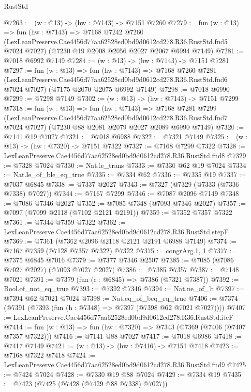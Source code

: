 \begin{lexlean}{RustStd}
\begin{coremodule}
@7263 := (w : @13) -> (hw : @7143) -> @7151 @7260
@7279 := fun (w : @13) =>
  fun (hw : @7143) =>
  @7168
    @7242
    @7260
    (LexLeanPreserve.Cae4456d77aa62528ed0bd9d0612cd278.R36.RustStd.fnd5 @7024 @7027)
    (@7230 @19 @2008 @2056 @2027 @2067 @6994 @7149)
@7281 := @7018 @6992 @7149
@7284 := (w : @13) -> (hw : @7143) -> @7151 @7281
@7297 := fun (w : @13) =>
  fun (hw : @7143) =>
  @7168
    @7260
    @7281
    (LexLeanPreserve.Cae4456d77aa62528ed0bd9d0612cd278.R36.RustStd.fnd6 @7024 @7027)
    (@7175 @2070 @2075 @6992 @7149)
@7298 := @7018 @6990
@7299 := @7298 @7149
@7302 := (w : @13) -> (hw : @7143) -> @7151 @7299
@7318 := fun (w : @13) =>
  fun (hw : @7143) =>
  @7168
    @7281
    @7299
    (LexLeanPreserve.Cae4456d77aa62528ed0bd9d0612cd278.R36.RustStd.fnd7 @7024 @7027)
    (@7230 @88 @2081 @2079 @2027 @2089 @6990 @7149)
@7320 := @7141 @19 @7027
@7321 := @7018 @6988
@7322 := @7321 @7149
@7325 := (w : @13) -> (hw : @7320) -> @7151 @7322
@7327 := @7168 @7299 @7322
@7328 := LexLeanPreserve.Cae4456d77aa62528ed0bd9d0612cd278.R36.RustStd.fnd8
@7329 := @7328 @7024
@7330 := Nat.le_trans
@7333 := @7330 @62 @19 @7024
@7334 := Nat.le_of_ble_eq_true
@7335 := @7334 @62
@7336 := @7335 @19
@7337 := @7037 @6845
@7338 := @7337 @2027
@7343 := @7327 (@7329 (@7333 (@7336 @7338) @7027))
@7344 := @7167 @7299
@7346 := @7087 @2096 @7149
@7348 := @7086 @7346 @2027
@7352 := @7085 @7348 (@7093 @7346 @2027)
@7357 := @7097 (@7099 @2118 (@7102 @2121 @2191))
@7359 := @7352 @7357 @7322
@7361 := @7344 @7359 @7322
@7362 := LexLeanPreserve.Cae4456d77aa62528ed0bd9d0612cd278.R36.RustStd.stepF
@7369 := @7361 (@7362 @2096 @2118 @2121 @2191 @6988 @7149)
@7374 := @7167 @7359 (@7128 @7357 @7322) @7322
@7375 := congrArg.{1, 1}
@7377 := @7375 @6845 @7016
@7379 := @7377 @7346 @2507
@7385 := @7085 (@7086 @7027 @2027) (@7093 @7027 @2027)
@7386 := @7385 @7357
@7387 := @7148 @7021
@7391 := @7379 (fun (c : @6845) => @7386 (@7321 @7387))
@7392 := Bool.of_not_eq_true
@7393 := @7392 @7346
@7394 := Nat.ne_of_lt
@7397 := @7394 @62 @7021 @7024
@7398 := Nat.eq_of_beq_eq_true
@7406 := @7374 (@7391 (@7393 (fun (h : @7348) => @7397 (@7398 @62 @7021 @7027))))
@7407 := LexLeanPreserve.Cae4456d77aa62528ed0bd9d0612cd278.R36.RustStd.iteF
@7414 := fun (w : @13) => fun (hw : @7320) => @7343 (@7369 (@7406 (@7407 @7357 @7322)))
@7416 := @7141 @88 @7027
@7417 := @7018 @6986
@7418 := @7417 @7149
@7421 := (w : @13) -> (hw : @7416) -> @7151 @7418
@7423 := @7168 @7322 @7418
@7424 := LexLeanPreserve.Cae4456d77aa62528ed0bd9d0612cd278.R36.RustStd.fnd9
@7425 := @7424 @7024
@7428 := @7330 @19 @88 @7024
@7429 := @7334 @19
@7435 := @7423 (@7425 (@7428 (@7429 @88 @7338) @7027))

\end{coremodule}
\end{lexlean}
